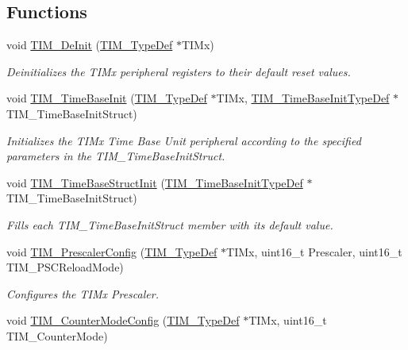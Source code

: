 \subsection*{Functions}
\begin{DoxyCompactItemize}
\item 
void \hyperlink{group___t_i_m___group1_ga1659cc0ce503ac151568e0c7c02b1ba5}{T\+I\+M\+\_\+\+De\+Init} (\hyperlink{struct_t_i_m___type_def}{T\+I\+M\+\_\+\+Type\+Def} $\ast$T\+I\+Mx)
\begin{DoxyCompactList}\small\item\em Deinitializes the T\+I\+Mx peripheral registers to their default reset values. \end{DoxyCompactList}\item 
void \hyperlink{group___t_i_m___group1_ga83fd58c9416802d9638bbe1715c98932}{T\+I\+M\+\_\+\+Time\+Base\+Init} (\hyperlink{struct_t_i_m___type_def}{T\+I\+M\+\_\+\+Type\+Def} $\ast$T\+I\+Mx, \hyperlink{struct_t_i_m___time_base_init_type_def}{T\+I\+M\+\_\+\+Time\+Base\+Init\+Type\+Def} $\ast$T\+I\+M\+\_\+\+Time\+Base\+Init\+Struct)
\begin{DoxyCompactList}\small\item\em Initializes the T\+I\+Mx Time Base Unit peripheral according to the specified parameters in the T\+I\+M\+\_\+\+Time\+Base\+Init\+Struct. \end{DoxyCompactList}\item 
void \hyperlink{group___t_i_m___group1_ga1556a0b9a5d53506875fd7de0cbc6b1f}{T\+I\+M\+\_\+\+Time\+Base\+Struct\+Init} (\hyperlink{struct_t_i_m___time_base_init_type_def}{T\+I\+M\+\_\+\+Time\+Base\+Init\+Type\+Def} $\ast$T\+I\+M\+\_\+\+Time\+Base\+Init\+Struct)
\begin{DoxyCompactList}\small\item\em Fills each T\+I\+M\+\_\+\+Time\+Base\+Init\+Struct member with its default value. \end{DoxyCompactList}\item 
void \hyperlink{group___t_i_m___group1_ga45c6fd9041baf7f64c121e0172f305c7}{T\+I\+M\+\_\+\+Prescaler\+Config} (\hyperlink{struct_t_i_m___type_def}{T\+I\+M\+\_\+\+Type\+Def} $\ast$T\+I\+Mx, uint16\+\_\+t Prescaler, uint16\+\_\+t T\+I\+M\+\_\+\+P\+S\+C\+Reload\+Mode)
\begin{DoxyCompactList}\small\item\em Configures the T\+I\+Mx Prescaler. \end{DoxyCompactList}\item 
void \hyperlink{group___t_i_m___group1_ga93941c1db20bf3794f377307df90a67b}{T\+I\+M\+\_\+\+Counter\+Mode\+Config} (\hyperlink{struct_t_i_m___type_def}{T\+I\+M\+\_\+\+Type\+Def} $\ast$T\+I\+Mx, uint16\+\_\+t T\+I\+M\+\_\+\+Counter\+Mode)

\end{DoxyCompactItemize}
